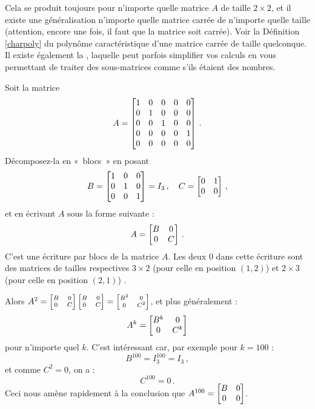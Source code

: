 Cela se produit toujours pour n'importe quelle matrice $A$ de taille $2 \times 2$, et il existe une généralisation n'importe quelle matrice carrée de n'importe quelle taille (attention, encore une fois, il faut que la matrice soit carrée). Voir la Définition \ref{charpoly} du  polynôme caractéristique d'une matrice carrée de taille quelconque.\\



Il existe également la , laquelle peut parfois simplifier vos calculs en vous permettant de traiter des
sous-matrices comme s'ils étaient des nombres.

\begin{myexample}
Soit la matrice
$$
A = \left[ \begin{matrix} 1 & 0 & 0 & 0 & 0\\
0 & 1 & 0 & 0 & 0\\
0 & 0&  1 & 0 & 0\\
0 & 0 & 0 & 0 & 1\\
0 & 0 & 0 & 0 & 0 \end{matrix} \right]\,.
$$
Décomposez-la  en «~blocs~» en posant
$$
B = \left[ \begin{matrix} 1 & 0 & 0 \\ 0 & 1 & 0\\ 0 & 0 & 1 \end{matrix} \right]=I_3\,,
\quad C = \left[ \begin{matrix} 0 & 1 \\ 0 & 0 \end{matrix} \right]\,,
$$
et en écrivant $A$ sous la forme suivante :
$$
A = \left[ \begin{matrix} B&0\\0&C \end{matrix} \right]\,.
$$
C'est une écriture par blocs de la matrice $A$. Les deux $0$ dans cette écriture sont des matrices de tailles respectives $3\times 2$ (pour celle en position $(1,2)$) et $2\times 3$ (pour celle en position $(2, 1)$) .

\medskip

Alors $A^2 = \scriptsize\left[ \begin{matrix} B&0\\0&C \end{matrix} \right]\left[ \begin{matrix} B&0\\0&C \end{matrix} \right]=\left[ \begin{matrix} B^2&0\\0&C^2 \end{matrix} \right]$, et plus généralement :
$$
A^{k} = \left[ \begin{matrix} B^{k} & 0 \\ 0& C^{k} \end{matrix} \right]
$$
pour n'importe quel $k$. C'est intéressant car, par exemple pour $k=100$ : 
$$
B^{100} = I_3^{100} = I_3\,,
$$
 et comme $C^2=0$, on a :
$$
C^{100} = 0\,.
$$
Ceci nous amène rapidement à la conclusion que $A^{100} = \left[ \begin{matrix} B&0\\0&0 \end{matrix} \right]$.
\end{myexample}



